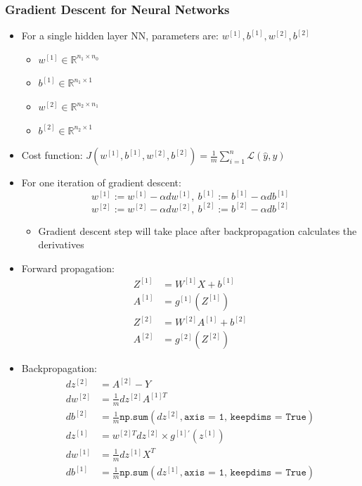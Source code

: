 \documentclass[12pt, letterpaper]{article}
\newcommand{\R}{\mathbb{R}}
\begin{document}
    \subsubsection{Gradient Descent for Neural Networks}
    \begin{itemize}
        \item For a single hidden layer NN, parameters are: $w^{[1]}, b^{[1]}, w^{[2]}, b^{[2]}$
        \begin{itemize}
            \item $w^{[1]}\in\R^{n_1\times n_0}$
            \item $b^{[1]}\in\R^{n_1\times 1}$
            \item $w^{[2]}\in\R^{n_2\times n_1}$
            \item $b^{[2]}\in\R^{n_2\times 1}$
        \end{itemize}
        \item Cost function: $J(w^{[1]}, b^{[1]}, w^{[2]}, b^{[2]})=\frac{1}{m}\sum_{i=1}^n\mathcal{L}(\hat{y},y)$
        \item For one iteration of gradient descent:
        $$w^{[1]}:=w^{[1]}-\alpha dw^{[1]},~b^{[1]}:=b^{[1]}-\alpha db^{[1]}$$
        $$w^{[2]}:=w^{[2]}-\alpha dw^{[2]},~b^{[2]}:=b^{[2]}-\alpha db^{[2]}$$
        \begin{itemize}
            \item Gradient descent step will take place after backpropagation calculates the derivatives
        \end{itemize}
        \item Forward propagation:
        \begin{align*}
            Z^{[1]}&=W^{[1]}X+b^{[1]} \\
            A^{[1]}&=g^{[1]}(Z^{[1]}) \\
            Z^{[2]}&=W^{[2]}A^{[1]}+b^{[2]} \\
            A^{[2]}&=g^{[2]}(Z^{[2]})
        \end{align*}
        \item Backpropagation:
        \begin{align*}
            dz^{[2]}&=A^{[2]}-Y \\
            dw^{[2]}&=\frac{1}{m}dz^{[2]}A^{[1]T} \\
            db^{[2]}&=\frac{1}{m}\texttt{np.sum}(dz^{[2]}, \texttt{axis = 1, keepdims = True}) \\
            dz^{[1]}&=w^{[2]T}dz^{[2]}\times g^{[1]'}(z^{[1]}) \\
            dw^{[1]}&=\frac{1}{m}dz^{[1]}X^T \\
            db^{[1]}&=\frac{1}{m}\texttt{np.sum}(dz^{[1]}, \texttt{axis = 1, keepdims = True})
        \end{align*}
    \end{itemize} 
\end{document}
